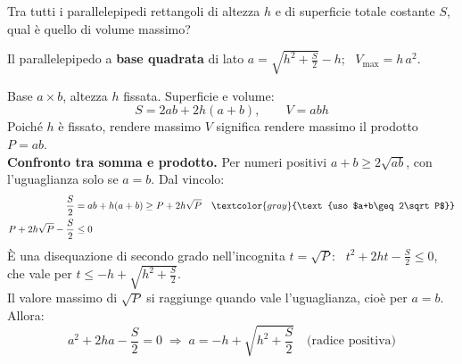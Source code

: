 \begin{question}[ID=2.2, subtitle={Parallelepipedo di massimo volume con superficie totale fissa}, tags={ottimizzazione, geometria, solidi}, difficulty=difficile]
Tra tutti i parallelepipedi rettangoli di altezza \(h\) e di superficie totale costante \(S\), qual è quello di volume massimo?
\begin{solution}
Il parallelepipedo a \textbf{base quadrata} di lato $a=\sqrt{h^2+\tfrac S2}-h$; \ $V_{\max}=h\,a^2$.
\end{solution}
\begin{explanation}
Base $a\times b$, altezza $h$ fissata. Superficie e volume:
\[ S=2ab+2h(a+b), \qquad V=abh \]
Poiché $h$ è fissato, rendere massimo $V$ significa rendere massimo il prodotto $P=ab$. \\
\textbf{Confronto tra somma e prodotto.} Per numeri positivi $a+b\geq2\sqrt{ab}$, con l'uguaglianza solo se $a=b$. Dal vincolo:
\[\begin{aligned}
\dfrac S2 &= ab+h(a+b)\geq P+2h\sqrt P && \textcolor{gray}{\text{uso $a+b\geq2\sqrt P$}}\\
P+2h\sqrt P-\dfrac S2 &\leq 0
\end{aligned}\]
È una disequazione di secondo grado nell'incognita $t=\sqrt P$: \ $t^2+2ht-\tfrac S2\leq0$, che vale per $t\leq-h+\sqrt{h^2+\tfrac S2}$. \\
Il valore massimo di $\sqrt P$ si raggiunge quando vale l'uguaglianza, cioè per $a=b$. Allora:
\[ a^2+2ha-\dfrac S2=0 \;\Rightarrow\; a=-h+\sqrt{h^2+\dfrac S2} \quad \text{(radice positiva)} \]
\end{explanation}
\end{question}


